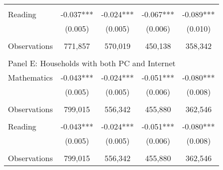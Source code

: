 {\begin{tabular}{lcccc}
&  &  & &  \\
Reading             &      -0.037***&      -0.024***&      -0.067***&      -0.089***\\
                    &     (0.005)   &     (0.005)   &     (0.006)   &     (0.010)   \\
                    &               &               &               &               \\
Observations        &     771,857   &     570,019   &     450,138   &     358,342   \\
 
&  &  & &  \\
\multicolumn{5}{l}{Panel E: Households with both PC and Internet} \\
Mathematics         &      -0.043***&      -0.024***&      -0.051***&      -0.080***\\
                    &     (0.005)   &     (0.005)   &     (0.006)   &     (0.008)   \\
                    &               &               &               &               \\
Observations        &     799,015   &     556,342   &     455,880   &     362,546   \\
 
&  &  & &  \\
Reading             &      -0.043***&      -0.024***&      -0.051***&      -0.080***\\
                    &     (0.005)   &     (0.005)   &     (0.006)   &     (0.008)   \\
                    &               &               &               &               \\
Observations        &     799,015   &     556,342   &     455,880   &     362,546   \\
 

\bottomrule
\end{tabular}
}

